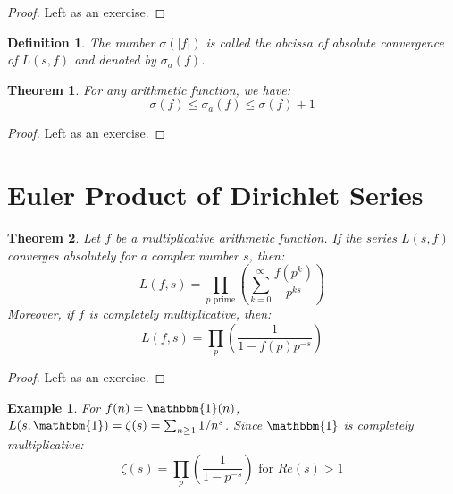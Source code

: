 \documentclass[12pt]{article}
\newtheorem{thm}{Theorem}
\newtheorem{exmp}{Example}
\newtheorem{defn}{Definition}
\begin{document}
\begin{proof}
	Left as an exercise.
\end{proof}

\begin{defn}
	The number $\sigma(\left| f \right|)$ is called the abcissa of absolute convergence of $L(s,f)$ and denoted by $\sigma_a(f)$.
\end{defn}

\begin{thm}
For any arithmetic function, we have:
$$
\sigma(f) \le \sigma_a(f) \le \sigma(f) + 1
$$
\end{thm}

\begin{proof}
	Left as an exercise.
\end{proof}

\section{Euler Product of Dirichlet Series}

\begin{thm}
Let $f$ be a multiplicative arithmetic function. If the series $L(s,f)$ converges absolutely for a complex number $s$, then:
$$
L(f,s) = \prod_{p \text{ prime}} \left( \sum_{k=0}^{\infty} \frac{f(p^k)}{p^{ks}} \right)
$$
Moreover, if $f$ is completely multiplicative, then:
$$
L(f,s) = \prod_{p} \left( \frac{1}{1 - f(p)p^{-s}} \right)
$$
\end{thm}

\begin{proof}
	Left as an exercise.
\end{proof}

\begin{exmp}
	For $f(n)=\mathbbm{1}(n)$, $L(s, \mathbbm{1}) = \zeta(s) = \sum_{n \ge 1} 1/n^s$. Since $\mathbbm{1}$ is completely multiplicative:
$$
\zeta(s) = \prod_{p} \left( \frac{1}{1 - p^{-s}} \right) \text{ for } Re(s) > 1
$$
\end{exmp}
\end{document}
